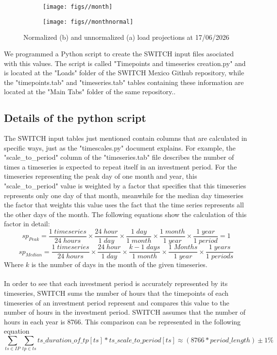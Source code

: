 \documentclass{article}
\begin{document}
\begin{figure}[H]
\centering
\begin{subfigure}[h]{.45\textwidth}
\texttt{[image: figs//month]}
\caption{}
\end{subfigure}
\begin{subfigure}[h]{.45\textwidth}
\texttt{[image: figs//monthnormal]}
\caption{}
\end{subfigure}
\caption{Normalized (b) and unnormalized (a) load projections at 17/06/2026}
\end{figure}  
We programmed a Python script to create the SWITCH input files asociated with this values. The  script is called "Timepoints and timeseries creation.py" and is located at the "Loads" folder of the SWITCH Mexico Github repository, while the "timepoints.tab" and "timeseries.tab" tables containing these information are located at the "Main Tabs" folder of the same repository.\cite{repo}.
\subsection{Details of the python script}
The SWITCH input tables just mentioned contain columns that are calculated in specific ways, just as the "timescales.py" document explains\cite{master}. For example, the "scale\_to\_period" column of the "timeseries.tab" file describes the number of times a timeseries is expected to repeat itself in an investment period. For the timeseries representing the peak day of one month and year, this "scale\_to\_period" value is weighted by a factor that specifies that this timeseries represents only one day of that month, meanwhile for the median day timeseries the factor that weights this value uses the fact that the time series represents all the other days of the month. The following equations show the calculation of this factor in detail:
\begin{equation}
sp_{Peak}= \frac{1 \; timeseries}{24 \; hours} \times \frac{24 \; hour}{1 \; day} \times \frac{1 \; day}{1 \; month} \times \frac{1 \; month}{1 \; year} \times \frac{1 \; year}{1 \; period} = 1
\end{equation}
\begin{equation}
sp_{Median}= \frac{1 \; timeseries}{24 \; hours} \times \frac{24 \; hour}{1 \; day} \times \frac{k-1 \; days}{1 \; month} \times \frac{1 \; Months}{1 \; year} \times \frac{1 \; years}{1 \; periods}
\end{equation}
Where $k$ is the number of days in the month of the given timeseries.
\\
\\ In order to see that each investment period is accurately represented by its timeseries, SWITCH sums the number of hours that the timepoints of each timeseries of an investment period represent and compares this value to the number of hours in the investment period. SWITCH assumes that the number of hours in each year is 8766. This comparison can be represented in the following equation
\begin{equation}
\sum_{ts \in IP} \sum_{tp \in ts} ts\_duration\_of\_tp[ts] * ts\_scale\_to\_period[ts] \approx (8766 * period\_length) \pm 1 \%
\end{equation}
\end{document}
